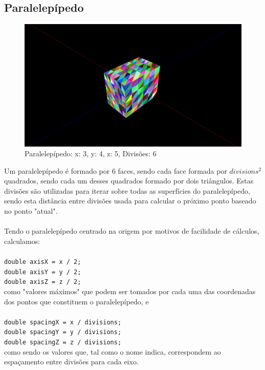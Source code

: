 \documentclass[a4paper]{article}
\begin{document}
\subsection{Paralelepípedo}
\begin{figure}[H]
\centering
\includegraphics[width=0.5\linewidth]{box.png}
\caption{Paralelepípedo: x: 3, y: 4, z: 5, Divisões: 6}
\end{figure}

Um paralelepípedo é formado por 6 faces, sendo cada face formada por $divisions^2$ quadrados, sendo cada um desses quadrados formado por dois triângulos. Estas divisões são utilizadas para iterar sobre todas as superfícies do paralelepípedo, sendo esta distância entre divisões usada para calcular o próximo ponto baseado no ponto "atual". \\
\\

Tendo o paralelepípedo centrado na origem por motivos de facilidade de cálculos, calculamos:\\
\\
\texttt{double axisX = x / 2;}\\
\texttt{double axisY = y / 2;}\\
\texttt{double axisZ = z / 2;}\\

como "valores máximos" que podem ser tomados por cada uma das coordenadas dos pontos que constituem o paralelepípedo, e\\
\\
\texttt{double spacingX = x / divisions;}\\
\texttt{double spacingY = y / divisions;}\\
\texttt{double spacingZ = z / divisions;}\\

como sendo os valores que, tal como o nome indica, correspondem ao espaçamento entre divisões para cada eixo.\\
\end{document}
